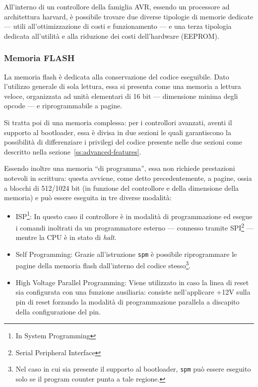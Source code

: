 All'interno di un controllore della famiglia AVR, essendo un processore ad architettura harvard, è possibile trovare due diverse tipologie di memorie dedicate --- utili all'ottimizzazione di costi e funzionamento --- e una terza tipologia dedicata all'utilità e alla riduzione dei costi dell'hardware (EEPROM).

\subsubsection{Memoria FLASH}
La memoria flash è dedicata alla conservazione del codice eseguibile.
Dato l'utilizzo generale di sola lettura, essa si presenta come una memoria a lettura veloce, organizzata ad unità elementari di 16 bit --- dimensione minima degli opcode\cite{avr:isa} --- e riprogrammabile a pagine.

Si tratta poi di una memoria complessa: per i controllori avanzati, aventi il supporto al bootloader, essa è divisa in due sezioni le quali garantiscono la possibilità di differenziare i privilegi del codice presente nelle due sezioni come descritto nella sezione~\ref{ss:advanced-features}.

Essendo inoltre una memoria ``di programma'', essa non richiede prestazioni notevoli in scrittura: questa avviene, come detto precedentemente, a pagine, ossia a blocchi di 512/1024 bit (in funzione del controllore e della dimensione della memoria) e può essere eseguita in tre diverse modalità:

\begin{itemize}
    \item ISP\footnote{In System Programming}: In questo caso il controllore è in modalità di programmazione ed esegue i comandi inoltrati da un programmatore esterno --- connesso tramite SPI\footnote{Serial Peripheral Interface} --- mentre la CPU è in stato di \textit{halt}.
    \item Self Programming: Grazie all'istruzione \texttt{spm} è possibile riprogrammare le pagine della memoria flash dall'interno del codice stesso\footnote{Nel caso in cui sia presente il supporto al bootloader, \texttt{spm} può essere eseguito solo se il program counter punta a tale regione.}.
    \item High Voltage Parallel Programming: Viene utilizzato in caso la linea di reset sia configurata con una funzione ausiliaria: consiste nell'applicare +12V sulla pin di reset forzando la modalità di programmazione parallela a discapito della configurazione del pin\cite[sec 28.6]{avr:m328p}.
\end{itemize}

